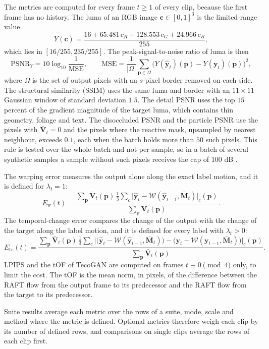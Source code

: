 The metrics are computed for every frame $t\ge1$ of every clip, because the first frame has no history. The luma of an RGB image $\mathbf{c}\in[0,1]^3$ is the limited-range value
\begin{equation}\label{eq:tsrm-luma}
Y(\mathbf{c})=\frac{16+65.481\,c_R+128.553\,c_G+24.966\,c_B}{255},
\end{equation}
which lies in $[16/255,235/255]$. The peak-signal-to-noise ratio of luma is then
\begin{equation}\label{eq:tsrm-psnr}
\mathrm{PSNR}_Y=10\log_{10}\frac{1}{\mathrm{MSE}},\qquad \mathrm{MSE}=\frac{1}{|\Omega|}\sum_{\mathbf{p}\in\Omega}\big(Y(\hat{\mathbf{y}}_t)(\mathbf{p})-Y(\mathbf{y}_t)(\mathbf{p})\big)^2,
\end{equation}
where $\Omega$ is the set of output pixels with an $s$-pixel border removed on each side. The structural similarity (SSIM) \cite{wang2004ssim} uses the same luma and border with an $11\times11$ Gaussian window of standard deviation $1.5$. The detail PSNR uses the top $15$ percent of the gradient magnitude of the target luma, which contains thin geometry, foliage and text. The disoccluded PSNR and the particle PSNR use the pixels with $\bar{\mathbf{V}}_t=0$ and the pixels where the reactive mask, upsampled by nearest neighbour, exceeds $0.1$, each when the batch holds more than $50$ such pixels. This rule is tested over the whole batch and not per sample, so in a batch of several synthetic samples a sample without such pixels receives the cap of $100$ dB \UnderRevision.

The warping error measures the output alone along the exact label motion, and it is defined for $\lambda_t=1$:
\begin{equation}\label{eq:tsrm-warpe}
E_\mathrm{w}(t)=\frac{\sum_{\mathbf{p}}\bar{\mathbf{V}}_t(\mathbf{p})\,\frac13\sum_c\big|\hat{\mathbf{y}}_t-\mathcal{W}(\hat{\mathbf{y}}_{t-1},\bar{\mathbf{M}}_t)\big|_c(\mathbf{p})}{\sum_{\mathbf{p}}\bar{\mathbf{V}}_t(\mathbf{p})}.
\end{equation}
The temporal-change error compares the change of the output with the change of the target along the label motion, and it is defined for every label with $\lambda_t>0$:
\begin{equation}\label{eq:tsrm-tce}
E_\mathrm{tc}(t)=\frac{\sum_{\mathbf{p}}\bar{\mathbf{V}}_t(\mathbf{p})\,\frac13\sum_c\big|\big(\hat{\mathbf{y}}_t-\mathcal{W}(\hat{\mathbf{y}}_{t-1},\bar{\mathbf{M}}_t)\big)-\big(\mathbf{y}_t-\mathcal{W}(\mathbf{y}_{t-1},\bar{\mathbf{M}}_t)\big)\big|_c(\mathbf{p})}{\sum_{\mathbf{p}}\bar{\mathbf{V}}_t(\mathbf{p})}.
\end{equation}
LPIPS \cite{zhang2018lpips} and the tOF of TecoGAN \cite{chu2020tecogan} are computed on frames $t\equiv0\pmod 4$ only, to limit the cost. The tOF is the mean norm, in pixels, of the difference between the RAFT flow from the output frame to its predecessor and the RAFT flow from the target to its predecessor.

Suite results average each metric over the rows of a suite, mode, scale and method where the metric is defined. Optional metrics therefore weigh each clip by its number of defined rows, and comparisons on single clips average the rows of each clip first.